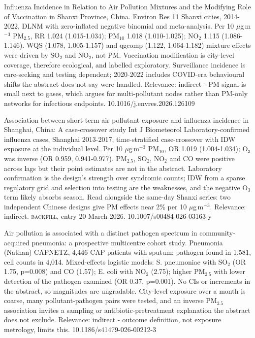 \documentclass[10pt]{article}
\begin{document}
\par{}\baselineskip{}\baselineskip
{}

{Influenza Incidence in Relation to Air Pollution Mixtures and the Modifying Role of Vaccination in Shanxi Province, China.}
{Environ Res}
{11 Shanxi cities, 2014-2022, DLNM with zero-inflated negative binomial and meta-analysis. Per 10 $\mu$g\,m$^{-3}$ PM$_{2.5}$, RR 1.024 (1.015-1.034); PM$_{10}$ 1.018 (1.010-1.025); NO$_2$ 1.115 (1.086-1.146). WQS (1.078, 1.005-1.157) and qgcomp (1.122, 1.064-1.182) mixture effects were driven by SO$_2$ and NO$_2$, not PM. Vaccination modification is city-level coverage, therefore ecological, and labelled exploratory. Surveillance incidence is care-seeking and testing dependent; 2020-2022 includes COVID-era behavioural shifts the abstract does not say were handled. Relevance: indirect - PM signal is small next to gases, which argues for multi-pollutant nodes rather than PM-only networks for infectious endpoints.}
{10.1016/j.envres.2026.126109}

{Association between short-term air pollutant exposure and influenza incidence in Shanghai, China: A case-crossover study}
{Int J Biometeorol}
{Laboratory-confirmed influenza cases, Shanghai 2013-2017, time-stratified case-crossover with IDW exposure at the individual level. Per 10 $\mu$g\,m$^{-3}$ PM$_{10}$, OR 1.019 (1.004-1.034); O$_3$ was inverse (OR 0.959, 0.941-0.977). PM$_{2.5}$, SO$_2$, NO$_2$ and CO were positive across lags but their point estimates are not in the abstract. Laboratory confirmation is the design's strength over syndromic counts; IDW from a sparse regulatory grid and selection into testing are the weaknesses, and the negative O$_3$ term likely absorbs season. Read alongside the same-day Shanxi series: two independent Chinese designs give PM effects near 2\% per 10 $\mu$g\,m$^{-3}$. Relevance: indirect. \textsc{backfill}, entry 20 March 2026.}
{10.1007/s00484-026-03163-y}

{Air pollution is associated with a distinct pathogen spectrum in community-acquired pneumonia: a prospective multicentre cohort study.}
{Pneumonia (Nathan)}
{CAPNETZ, 4,446 CAP patients with sputum; pathogen found in 1,581, cell counts in 4,014. Mixed-effects logistic models: S. pneumoniae with SO$_2$ (OR 1.75, p=0.008) and CO (1.57); E. coli with NO$_2$ (2.75); higher PM$_{2.5}$ with lower detection of the pathogen examined (OR 0.37, p=0.001). No CIs or increments in the abstract, so magnitudes are ungradable. City-level exposure over a month is coarse, many pollutant-pathogen pairs were tested, and an inverse PM$_{2.5}$ association invites a sampling or antibiotic-pretreatment explanation the abstract does not exclude. Relevance: indirect - outcome definition, not exposure metrology, limits this.}
{10.1186/s41479-026-00212-3}
\end{document}
